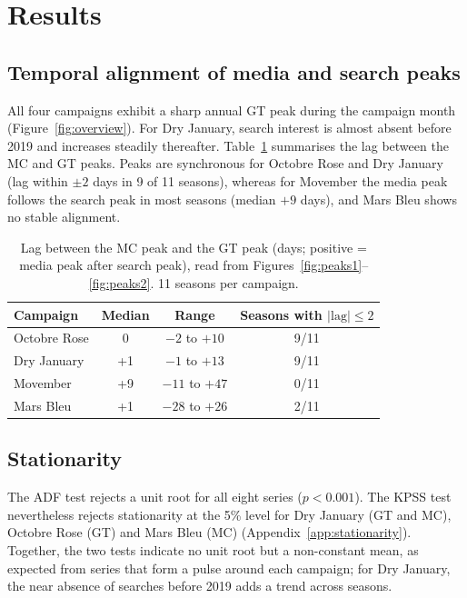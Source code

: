 \documentclass[11pt,a4paper]{article}
\begin{document}
\section{Results}
\subsection{Temporal alignment of media and search peaks}
All four campaigns exhibit a sharp annual GT peak during the campaign month (Figure~\ref{fig:overview}). For Dry January, search interest is almost absent before 2019 and increases steadily thereafter. Table~\ref{tab:peaklag} summarises the lag between the MC and GT peaks. Peaks are synchronous for Octobre Rose and Dry January (lag within $\pm2$ days in 9 of 11 seasons), whereas for Movember the media peak follows the search peak in most seasons (median $+9$ days), and Mars Bleu shows no stable alignment.

\begin{table}[htbp]
\centering
\caption{Lag between the MC peak and the GT peak (days; positive = media peak after search peak), read from Figures~\ref{fig:peaks1}--\ref{fig:peaks2}. 11 seasons per campaign.}
\label{tab:peaklag}
\begin{tabular}{lccc}
\toprule
Campaign & Median & Range & Seasons with $|\text{lag}|\le 2$ \\
\midrule
Octobre Rose & 0  & $-2$ to $+10$  & 9/11 \\
Dry January  & +1 & $-1$ to $+13$  & 9/11 \\
Movember     & +9 & $-11$ to $+47$ & 0/11 \\
Mars Bleu    & +1 & $-28$ to $+26$ & 2/11 \\
\bottomrule
\end{tabular}
\end{table}

\subsection{Stationarity}
The ADF test rejects a unit root for all eight series ($p<0.001$). The KPSS test nevertheless rejects stationarity at the 5\% level for Dry January (GT and MC), Octobre Rose (GT) and Mars Bleu (MC) (Appendix~\ref{app:stationarity}). Together, the two tests indicate no unit root but a non-constant mean, as expected from series that form a pulse around each campaign; for Dry January, the near absence of searches before 2019 adds a trend across seasons.
\end{document}
